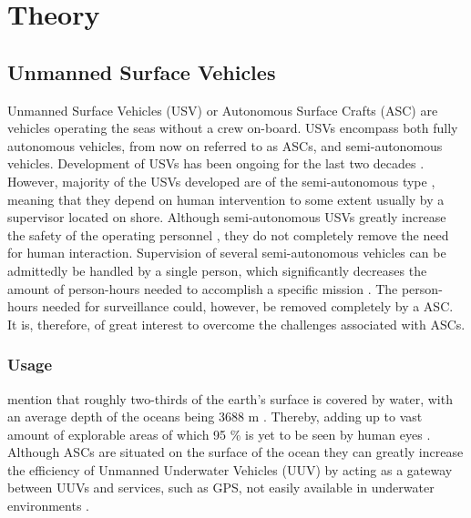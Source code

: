 \chapter{Theory} %

\label{Theory} %
\section{Unmanned Surface Vehicles}
\cite{jokioinen2016remote}

Unmanned Surface Vehicles (USV) or Autonomous Surface Crafts (ASC) are vehicles operating the seas without a crew on-board.
USVs encompass both fully autonomous vehicles, from now on referred to as ASCs, and semi-autonomous vehicles.
Development of USVs has been ongoing for the last two decades \cite{manley2008unmanned}.
However, majority of the USVs developed are of the semi-autonomous type \cite{liu2016unmanned,park2017development}, meaning that they depend on human intervention to some extent usually by a supervisor located on shore.
Although semi-autonomous USVs greatly increase the safety of the operating personnel \cite{liu2016unmanned}, they do not completely remove the need for human interaction.
Supervision of several semi-autonomous vehicles can be admittedly be handled by a single person, which significantly decreases the amount of person-hours needed to accomplish a specific mission \cite{manley2008unmanned}.
The person-hours needed for surveillance could, however, be removed completely by a ASC.
It is, therefore, of great interest to overcome the challenges associated with ASCs.


\subsection{Usage}
\textcite{Yuh2011} mention that roughly two-thirds of the earth's surface is covered by water, with an average depth of the oceans being 3688 m \cite{depth_ocean}.
Thereby, adding up to vast amount of explorable areas of which 95 \% is yet to be seen by human eyes \cite{explored_percentage}.
Although ASCs are situated on the surface of the ocean they can greatly increase the efficiency of Unmanned Underwater Vehicles (UUV) by acting as a gateway between UUVs and services, such as GPS, not easily available in underwater environments \cite{liu2016unmanned}.


